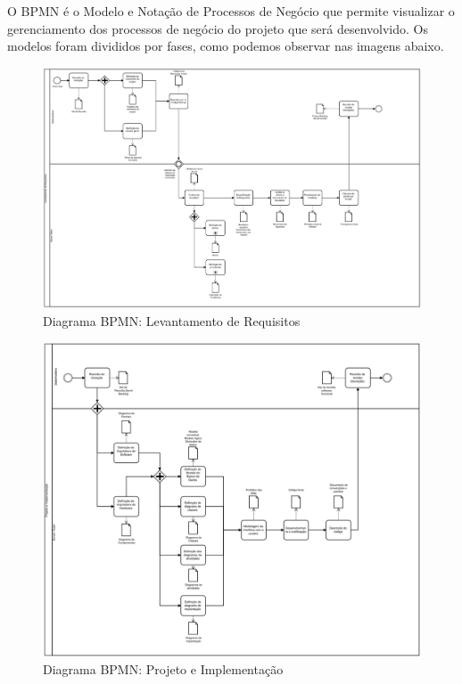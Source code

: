 \documentclass[	DIV=calc,%
							paper=a4,%
							fontsize=12pt,%
							onecolumn]{scrartcl}%
\begin{document}
O BPMN é o Modelo e Notação de Processos de Negócio que permite visualizar o gerenciamento dos processos de negócio do projeto que será desenvolvido. Os modelos foram divididos por fases, como podemos observar nas imagens abaixo.


\begin{figure}
\centering
\includegraphics[width=\textwidth]{glevantamento.png}
\caption{Diagrama BPMN: Levantamento de Requisitos}
\label{levantamento}
\end{figure}
\FloatBarrier

\begin{figure}
\centering
\includegraphics[width=\textwidth]{projeto_implementacao.png}
\caption{Diagrama BPMN: Projeto e Implementação}
\label{projeto}
\end{figure}
\FloatBarrier
\end{document}
